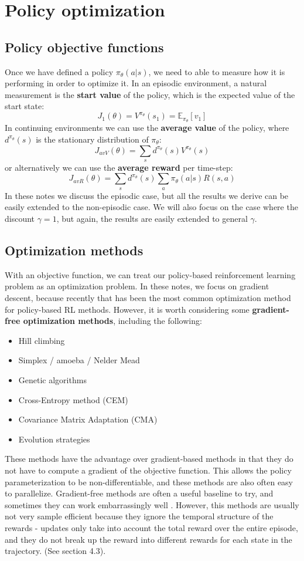 \documentclass{article}
\newcommand{\E}{\mathbb{E}}                                        %
\begin{document}
\section{Policy optimization}
\subsection{Policy objective functions}
Once we have defined a policy $\pi_\theta(a|s)$, we need to able to measure how it is performing in order to optimize it. In an episodic environment, a natural measurement is the \textbf{start value} of the policy, which is the expected value of the start state:
    \[ J_1(\theta) = V^{\pi_\theta}(s_1) = \E_{\pi_\theta}[v_1] \]
In continuing environments we can use the \textbf{average value} of the policy, where $d^{\pi_\theta}(s)$ is the stationary distribution of $\pi_\theta$:
    \[ J_{avV}(\theta) = \sum_s d^{\pi_\theta}(s) V^{\pi_\theta}(s) \]
or alternatively we can use the \textbf{average reward} per time-step:
    \[ J_{avR}(\theta) = \sum_s d^{\pi_\theta}(s) \sum_a \pi_\theta(a|s) R(s,a) \]
In these notes we discuss the episodic case, but all the results we derive can be easily extended to the non-episodic case. We will also focus on the case where the discount $\gamma = 1$, but again, the results are easily extended to general $\gamma$.

\subsection{Optimization methods}
With an objective function, we can treat our policy-based reinforcement learning problem as an optimization problem. In these notes, we focus on gradient descent, because recently that has been the most common optimization method for policy-based RL methods. However, it is worth considering some \textbf{gradient-free optimization methods}, including the following:

\begin{itemize}[nosep]
\item Hill climbing
\item Simplex / amoeba / Nelder Mead
\item Genetic algorithms
\item Cross-Entropy method (CEM)
\item Covariance Matrix Adaptation (CMA)
\item Evolution strategies
\end{itemize}

These methods have the advantage over gradient-based methods in that they do not have to compute a gradient of the objective function. This allows the policy parameterization to be non-differentiable, and these methods are also often easy to parallelize. Gradient-free methods are often a useful baseline to try, and sometimes they can work embarrassingly well \cite{ES}. However, this methods are usually not very sample efficient because they ignore the temporal structure of the rewards - updates only take into account the total reward over the entire episode, and they do not break up the reward into different rewards for each state in the trajectory. (See section 4.3).
\end{document}
